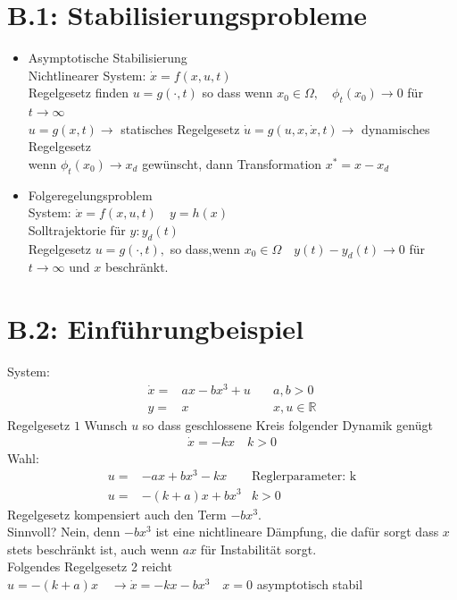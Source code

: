 \documentclass[ngerman]{tudscrreprt}
\begin{document}
\section*{\textbf{B.1:} Stabilisierungsprobleme}
\begin{itemize}
\item Asymptotische Stabilisierung\\
Nichtlinearer System: $\dot x = f(x,u,t) $ \\Regelgesetz finden $u = g(\cdot ,t)$ so dass wenn $x_0 \in \Omega, \quad \phi_t(x_0) \rightarrow 0$ für $t\to \infty$\\
$u = g(x,t) \rightarrow $ statisches Regelgesetz $\dot u = g(u,x,\dot x,t) \rightarrow $ dynamisches Regelgesetz \\
wenn $\phi_t(x_0) \rightarrow x_d$ gewünscht, dann Transformation $x^* = x-x_d$
\item Folgeregelungsproblem\\
System: $\dot x = f(x,u,t) \quad y= h(x) $\\
Solltrajektorie für $y: y_d(t)$\\
Regelgesetz $u = g(\cdot , t) ,$ so dass,wenn $x_0 \in \Omega \quad y(t) - y_d(t) \rightarrow 0 $ für $t\to \infty$ und $x$ beschränkt.
\end{itemize}
\section*{\textbf{B.2: }Einführungbeispiel}
System: \begin{align*}\dot x =& ax - bx^3 + u \quad &a,b>0\\
y=&x &x,u \in \mathbb{R}
\end{align*}
Regelgesetz $1$ Wunsch $u$ so dass geschlossene Kreis folgender Dynamik genügt
\begin{align*}
\dot x = - k x\quad k>0
\end{align*}
Wahl: 
\begin{align*}
u =& - a x + b x^3-kx \quad &\text{Reglerparameter: k}\\
u=& - (k+a)x + b x^3 &k>0
\end{align*}
Regelgesetz kompensiert auch den Term $-bx^3$.\\
Sinnvoll? Nein, denn $-bx^3$ ist eine nichtlineare Dämpfung, die dafür sorgt dass $x$ stets beschränkt ist, auch wenn $ax$ für Instabilität sorgt.\\
Folgendes Regelgesetz 2 reicht\\
$u = - (k+a)x \quad \rightarrow \dot x =-kx - bx^3 \quad x=0 $ asymptotisch stabil
\end{document}
